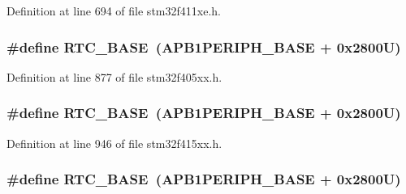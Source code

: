 Definition at line 694 of file stm32f411xe.\+h.

\subsubsection[{\texorpdfstring{R\+T\+C\+\_\+\+B\+A\+SE}{RTC_BASE}}]{\setlength{\rightskip}{0pt plus 5cm}\#define R\+T\+C\+\_\+\+B\+A\+SE~({\bf A\+P\+B1\+P\+E\+R\+I\+P\+H\+\_\+\+B\+A\+SE} + 0x2800\+U)}\hypertarget{group___peripheral__registers__structures_ga4265e665d56225412e57a61d87417022}{}\label{group___peripheral__registers__structures_ga4265e665d56225412e57a61d87417022}


Definition at line 877 of file stm32f405xx.\+h.

\subsubsection[{\texorpdfstring{R\+T\+C\+\_\+\+B\+A\+SE}{RTC_BASE}}]{\setlength{\rightskip}{0pt plus 5cm}\#define R\+T\+C\+\_\+\+B\+A\+SE~({\bf A\+P\+B1\+P\+E\+R\+I\+P\+H\+\_\+\+B\+A\+SE} + 0x2800\+U)}\hypertarget{group___peripheral__registers__structures_ga4265e665d56225412e57a61d87417022}{}\label{group___peripheral__registers__structures_ga4265e665d56225412e57a61d87417022}


Definition at line 946 of file stm32f415xx.\+h.

\subsubsection[{\texorpdfstring{R\+T\+C\+\_\+\+B\+A\+SE}{RTC_BASE}}]{\setlength{\rightskip}{0pt plus 5cm}\#define R\+T\+C\+\_\+\+B\+A\+SE~({\bf A\+P\+B1\+P\+E\+R\+I\+P\+H\+\_\+\+B\+A\+SE} + 0x2800\+U)}\hypertarget{group___peripheral__registers__structures_ga4265e665d56225412e57a61d87417022}{}\label{group___peripheral__registers__structures_ga4265e665d56225412e57a61d87417022}


